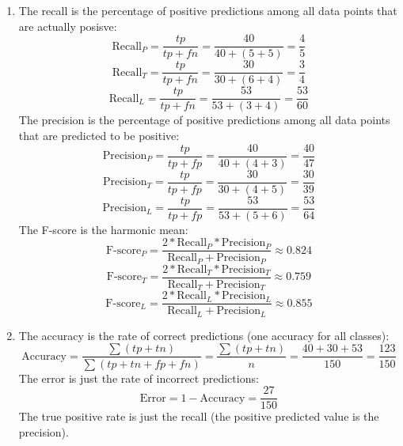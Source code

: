 \documentclass[12pt]{article}
\begin{document}
\begin{enumerate}[label = \letters]
    \item 
    The recall is the percentage of positive
    predictions among all data points that are actually
    posisve:
    \[ \text{Recall}_P = \dfrac{tp}{tp + fn} 
    = \dfrac{40}{40 + (5 + 5)}  = \dfrac{4}{5} \]
    \[ \text{Recall}_T = \dfrac{tp}{tp + fn} 
    = \dfrac{30}{30 + (6 + 4)}  = \dfrac{3}{4} \]
    \[ \text{Recall}_L = \dfrac{tp}{tp + fn} 
    = \dfrac{53}{53 + (3 + 4)}  = \dfrac{53}{60} \]
    The precision is the percentage of positive
    predictions among all data points that are
    predicted to be positive:
    \[ \text{Precision}_P = \dfrac{tp}{tp + fp} 
    = \dfrac{40}{40 + (4 + 3)}  = \dfrac{40}{47} \]
    \[ \text{Precision}_T = \dfrac{tp}{tp + fp} 
    = \dfrac{30}{30 + (4 + 5)}  = \dfrac{30}{39} \]
    \[ \text{Precision}_L = \dfrac{tp}{tp + fp} 
    = \dfrac{53}{53 + (5 + 6)}  = \dfrac{53}{64} \]
    The F-score is the harmonic mean:
    \[ \text{F-score}_P = 
    \dfrac{2 * \text{Recall}_P * \text{Precision}_P}
    {\text{Recall}_P + \text{Precision}_P} \approx
    0.824 \]
    \[ \text{F-score}_T = 
    \dfrac{2 * \text{Recall}_T * \text{Precision}_T}
    {\text{Recall}_T + \text{Precision}_T} \approx
    0.759 \]
    \[ \text{F-score}_L = 
    \dfrac{2 * \text{Recall}_L * \text{Precision}_L}
    {\text{Recall}_L + \text{Precision}_L} \approx
    0.855 \]
\item 
    The accuracy is the rate of correct
    predictions (one accuracy for all classes):
    \[ \text{Accuracy} = \dfrac{\sum (tp + tn)}
    {\sum (tp + tn + fp + fn)} = \dfrac{\sum (tp + tn)}{n}
    = \dfrac{40 + 30 + 53}{150} = \dfrac{123}{150} \]
    The error is just the rate of incorrect predictions:
    \[ \text{Error} = 1 - \text{Accuracy} = \dfrac{27}{150} \]
    The true positive rate is just the recall
    (the positive predicted value is the precision). \\

\end{enumerate}

\newpage
\end{document}
